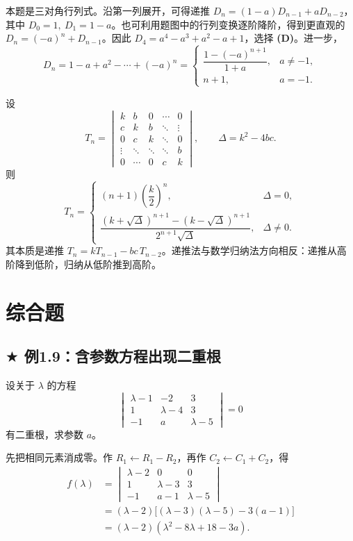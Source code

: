 \documentclass[UTF8,zihao=5,fontset=mac]{ctexart}
\newcommand{\dmat}[1]{\begin{vmatrix}#1\end{vmatrix}}
\newcommand{\tagstar}{\textcolor{warm}{$\bigstar$}}
\begin{document}
本题是三对角行列式。沿第一列展开，可得递推 $D_n=(1-a)D_{n-1}+aD_{n-2}$，其中 $D_0=1,\ D_1=1-a$。也可利用题图中的行列变换逐阶降阶，得到更直观的 $D_n=(-a)^n+D_{n-1}$。因此 $D_4=a^4-a^3+a^2-a+1$，选择 \textbf{(D)}。进一步，
\[
D_n=1-a+a^2-\cdots+(-a)^n=
\begin{cases}
\dfrac{1-(-a)^{n+1}}{1+a},&a\ne-1,\\[2mm]
n+1,&a=-1.
\end{cases}
\]

\begin{summarybox}[注：常系数三对角公式]
设
\[
T_n=\dmat{k&b&0&\cdots&0\\c&k&b&\ddots&\vdots\\0&c&k&\ddots&0\\\vdots&\ddots&\ddots&\ddots&b\\0&\cdots&0&c&k},\qquad
\Delta=k^2-4bc.
\]
则
\[
T_n=
\begin{cases}
(n+1)\left(\dfrac{k}{2}\right)^n,&\Delta=0,\\[2mm]
\dfrac{(k+\sqrt\Delta)^{n+1}-(k-\sqrt\Delta)^{n+1}}{2^{n+1}\sqrt\Delta},&\Delta\ne0.
\end{cases}
\]
其本质是递推 $T_n=kT_{n-1}-bc\,T_{n-2}$。递推法与数学归纳法方向相反：递推从高阶降到低阶，归纳从低阶推到高阶。
\end{summarybox}

\clearpage
\section{综合题}

\subsection{\texorpdfstring{\tagstar}{星标} 例1.9：含参数方程出现二重根}
\begin{problembox}[星标题]
设关于 $\lambda$ 的方程
\[
\dmat{\lambda-1&-2&3\\1&\lambda-4&3\\-1&a&\lambda-5}=0
\]
有二重根，求参数 $a$。
\end{problembox}

先把相同元素消成零。作 $R_1\leftarrow R_1-R_2$，再作 $C_2\leftarrow C_1+C_2$，得
\begin{align*}
f(\lambda)
&=\dmat{\lambda-2&0&0\\1&\lambda-3&3\\-1&a-1&\lambda-5}\\
&=(\lambda-2)\bigl[(\lambda-3)(\lambda-5)-3(a-1)\bigr]\\
&=(\lambda-2)(\lambda^2-8\lambda+18-3a).
\end{align*}
\end{document}
